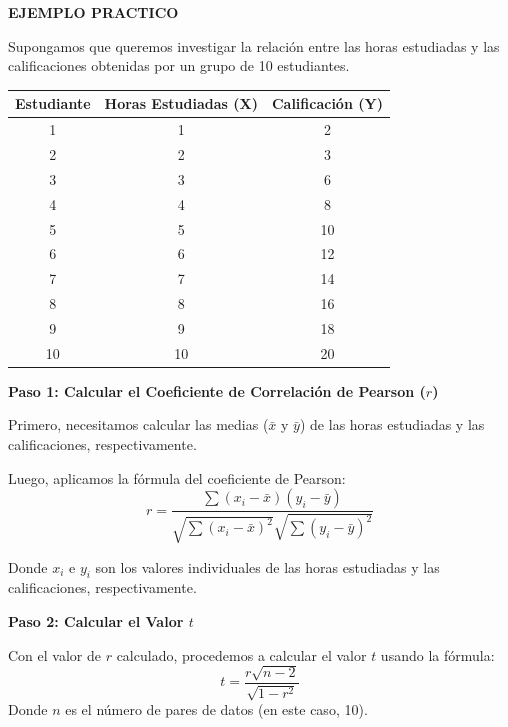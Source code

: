 \documentclass{article}
\begin{document}
\textbf{EJEMPLO PRACTICO}

Supongamos que queremos investigar la relación entre las horas estudiadas y las calificaciones obtenidas por un grupo de 10 estudiantes.  \\

\begin{table}[ht]
    \centering
    \begin{tabular}{ccc}
        \hline
        Estudiante & Horas Estudiadas (X) & Calificación (Y) \\
        \hline
        1          & 1                    & 2                \\
        2          & 2                    & 3                \\
        3          & 3                    & 6                \\
        4          & 4                    & 8                \\
        5          & 5                    & 10               \\
        6          & 6                    & 12               \\
        7          & 7                    & 14               \\
        8          & 8                    & 16               \\
        9          & 9                    & 18               \\
        10         & 10                   & 20               \\
        \hline
    \end{tabular}
\end{table}

\textbf{Paso 1: Calcular el Coeficiente de Correlación de Pearson ($r$)}

Primero, necesitamos calcular las medias ($\bar{x}$ y $\bar{y}$) de las horas estudiadas y las calificaciones, respectivamente.

Luego, aplicamos la fórmula del coeficiente de Pearson:
\[ r = \frac{\sum (x_i - \bar{x})(y_i - \bar{y})}{\sqrt{\sum (x_i - \bar{x})^2} \sqrt{\sum (y_i - \bar{y})^2}} \]


Donde $x_i$ e $y_i$ son los valores individuales de las horas estudiadas y las calificaciones, respectivamente.

\textbf{Paso 2: Calcular el Valor $t$}

Con el valor de $r$ calculado, procedemos a calcular el valor $t$ usando la fórmula:
\[ t = \frac{r\sqrt{n-2}}{\sqrt{1-r^2}} \]
Donde $n$ es el número de pares de datos (en este caso, 10).
\end{document}

